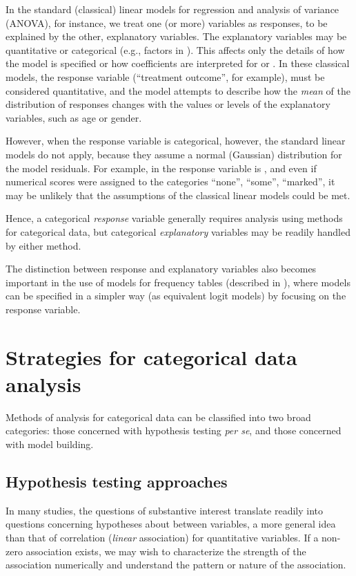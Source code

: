 \documentclass[11pt]{book}
\begin{document}
In the standard (classical) linear models for regression and analysis of variance
(ANOVA), for instance, we treat one (or more) variables as responses,
to be explained by the other, explanatory variables.
The explanatory variables may be quantitative or categorical
(e.g., factors in \R). 
This affects only the details of how the model is specified
or how coefficients are interpreted for
 or .  In these classical models,
the response variable (``treatment outcome'', for example), must be
considered quantitative,  and the model attempts to describe how the
\emph{mean} of the distribution of responses changes with the values
or levels of the explanatory variables, such as age or gender.

However, when the response variable is categorical, however, the standard linear
models do not apply, because they assume a normal (Gaussian) distribution
for the model residuals.  For example, in  
the response variable
is , and even if numerical scores were assigned
to the categories ``none'', ``some'', ``marked'', it may be unlikely
that the assumptions of the classical linear models could be met.

Hence, a categorical \emph{response} variable generally requires analysis
using methods for categorical data, but categorical \emph{explanatory} variables
may be readily handled by either method.

The distinction between response and explanatory variables also
becomes important in the use of \loglin models for frequency tables
(described in ), where models can be specified
in a simpler way (as equivalent logit models) by focusing on the response
variable.


\section{Strategies for categorical data analysis}\label{sec:strategies}

Methods of analysis for categorical data can be classified into two
broad categories:
those concerned with hypothesis testing \emph{per se}, and those concerned with model building.

\subsection{Hypothesis testing approaches}\label{sec:strategies-hyp}
In many studies, the questions of substantive interest translate readily
into questions concerning hypotheses about  between variables, a more general idea than that of correlation 
(\emph{linear} association) for quantitative variables.
If a non-zero association exists, we may wish to characterize the
strength of the association numerically and understand the pattern or
nature of the association.
\end{document}
